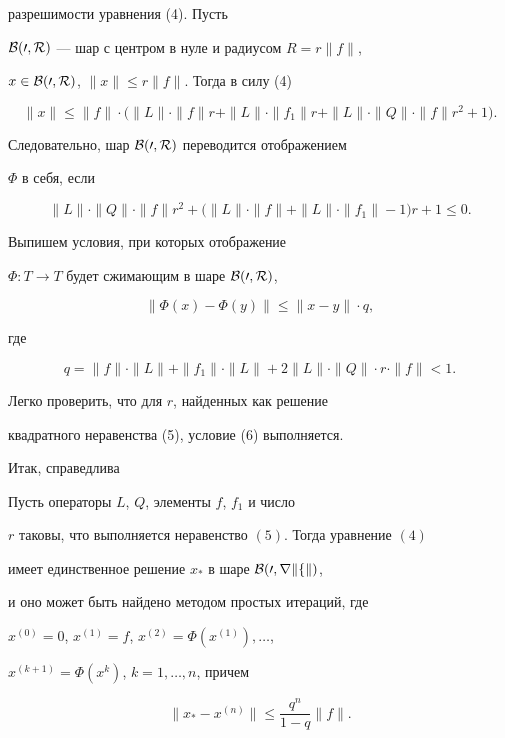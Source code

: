разрешимости уравнения (4). Пусть 


$\cal{B}(0,R)$ --- шар с центром в нуле и радиусом $R=r\|f\|$,


$x\in \cal{B}(0,R)$, $\|x\|\leq r\|f\|$. Тогда в силу (4)


$$


\|x\|\leq\|f\|\cdot\big(\|L\|\cdot\|f\|r+\|L\|


\cdot\|f_1\|r+\|L\|\cdot\|Q\|\cdot\|f\|r^2+1\big).


$$


Следовательно, шар $\cal{B}(0,R)$ переводится отображением


$\Phi$ в себя, если


\begin{equation}


\|L\|\cdot\|Q\|\cdot\|f\|r^2+\big(\|L\|\cdot\|f\|+\|L\|


\cdot\|f_1\|-1\big)r+1\leq0.


\end{equation}


Выпишем условия, при которых отображение


$\Phi:T\rightarrow T$ будет сжимающим в шаре $\cal{B}(0,R)$,


$$


\|\Phi(x)-\Phi(y)\|\leq\|x-y\|\cdot q,


$$


где


\begin{equation}


q=\|f\|\cdot\|L\|+\|f_1\|\cdot\|L\|+2\|L\|\cdot\|Q\|\cdot


r\cdot\|f\|<1.


\end{equation}


Легко проверить, что для $r$, найденных как решение


квадратного неравенства (5), условие (6) выполняется.





Итак, справедлива








\begin{lem}


Пусть операторы $L$, $Q$, элементы $f$, $f_1$ и число


$r$ таковы, что выполняется неравенство $(5)$. Тогда уравнение $(4)$


имеет единственное решение $x_*$ в шаре $\cal{B}(0,r\|f\|)$,


и оно может быть найдено методом простых итераций, где


$x^{(0)}=0$, $x^{(1)}=f$, $x^{(2)}=\Phi(x^{(1)}),\dotsc$,  %


$x^{(k+1)}=\Phi(x^k)$, $k=1,\dotsc,n$, причем


$$


\|x_*-x^{(n)}\|\leq \frac{q^{n}}{1-q}\|f\|.


$$


\end{lem}








